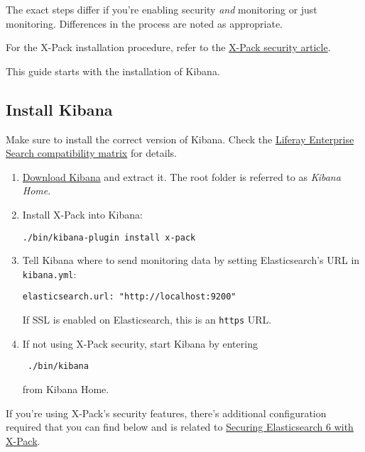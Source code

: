 The exact steps differ if you're enabling security \emph{and} monitoring
or just monitoring. Differences in the process are noted as appropriate.

For the X-Pack installation procedure, refer to the
\href{/docs/7-0/deploy/-/knowledge_base/d/securing-elasticsearch-6-with-x-pack}{X-Pack
security article}.

This guide starts with the installation of Kibana.

\subsection{Install Kibana}\label{install-kibana-1}

Make sure to install the correct version of Kibana. Check the
\href{https://help.liferay.com/hc/en-us/articles/360016511651\#Liferay-Enterprise-Search}{Liferay
Enterprise Search compatibility matrix} for details.

\begin{enumerate}
\def\labelenumi{\arabic{enumi}.}
\item
  \href{https://www.elastic.co/downloads/kibana}{Download Kibana} and
  extract it. The root folder is referred to as \emph{Kibana Home}.
\item
  Install X-Pack into Kibana:

\begin{verbatim}
./bin/kibana-plugin install x-pack
\end{verbatim}
\item
  Tell Kibana where to send monitoring data by setting Elasticsearch's
  URL in \texttt{kibana.yml}:

\begin{verbatim}
elasticsearch.url: "http://localhost:9200"
\end{verbatim}

  If SSL is enabled on Elasticsearch, this is an \texttt{https} URL.
\item
  If not using X-Pack security, start Kibana by entering

\begin{verbatim}
 ./bin/kibana
\end{verbatim}

  from Kibana Home.
\end{enumerate}

If you're using X-Pack's security features, there's additional
configuration required that you can find below and is related to
\href{/docs/7-0/deploy/-/knowledge_base/d/securing-elasticsearch-6-with-x-pack}{Securing
Elasticsearch 6 with X-Pack}.

